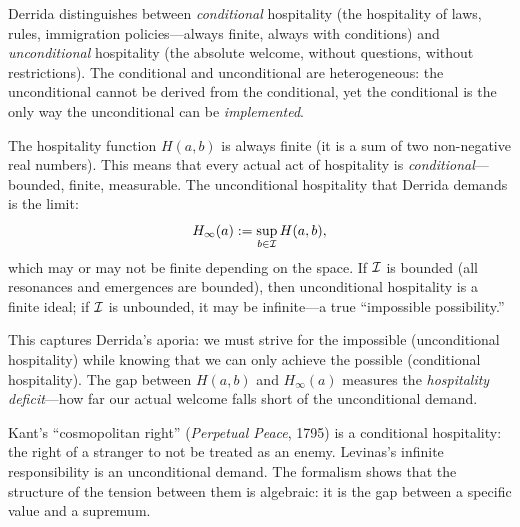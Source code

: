 \begin{interpretation}
Derrida distinguishes between \emph{conditional} hospitality (the hospitality
of laws, rules, immigration policies---always finite, always with conditions)
and \emph{unconditional} hospitality (the absolute welcome, without
questions, without restrictions). The conditional and unconditional are
heterogeneous: the unconditional cannot be derived from the conditional, yet
the conditional is the only way the unconditional can be \emph{implemented}.

The hospitality function $H(a,b)$ is always finite (it is a sum of two
non-negative real numbers). This means that every actual act of hospitality
is \emph{conditional}---bounded, finite, measurable. The unconditional
hospitality that Derrida demands is the limit:
\[
H_{\infty}(a) := \sup_{b \in \mathcal{I}} H(a, b),
\]
which may or may not be finite depending on the space. If $\mathcal{I}$ is bounded
(all resonances and emergences are bounded), then unconditional hospitality
is a finite ideal; if $\mathcal{I}$ is unbounded, it may be infinite---a true
``impossible possibility.''

This captures Derrida's aporia: we must strive for the impossible
(unconditional hospitality) while knowing that we can only achieve the
possible (conditional hospitality). The gap between $H(a,b)$ and $H_\infty(a)$
measures the \emph{hospitality deficit}---how far our actual welcome falls
short of the unconditional demand.

Kant's ``cosmopolitan right'' (\textit{Perpetual Peace}, 1795) is a
conditional hospitality: the right of a stranger to not be treated as an
enemy. Levinas's infinite responsibility is an unconditional demand. The
formalism shows that the structure of the tension between them is algebraic:
it is the gap between a specific value and a supremum.
\end{interpretation}

